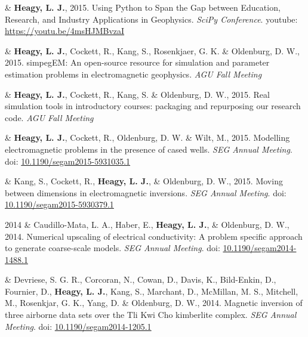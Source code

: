 \documentclass[a4paper, 11pt]{article}
\newcommand{\doi}[1]{doi: \href{https://doi.org/#1}{#1}}
\newcommand{\youtube}[1]{youtube: \href{https://youtu.be/XY3Tq9Wd1\_A}{#1}}
\begin{document}
\begin{entryright}
& \textbf{Heagy, L. J.}, 2015. Using Python to Span the Gap between Education, Research, and Industry Applications in Geophysics. \emph{SciPy Conference}. \youtube{https://youtu.be/4msHJMBvzaI}
\end{entryright}

\begin{entryright}
& \textbf{Heagy, L. J.}, Cockett, R., Kang, S., Rosenkjaer, G. K. \& Oldenburg, D. W., 2015. simpegEM: An open-source resource for simulation and parameter estimation problems in electromagnetic geophysics. \emph{AGU Fall Meeting}
\end{entryright}

\begin{entryright}
& \textbf{Heagy, L. J.}, Cockett, R., Kang, S. \& Oldenburg, D. W., 2015. Real simulation tools in introductory courses: packaging and repurposing our research code. \emph{AGU Fall Meeting}
\end{entryright}

\begin{entryright}
& \textbf{Heagy, L. J.}, Cockett, R., Oldenburg, D. W. \& Wilt, M., 2015. Modelling electromagnetic problems in the presence of cased wells. \emph{SEG Annual Meeting}. \doi{10.1190/segam2015-5931035.1}
\end{entryright}

\begin{entryright}
& Kang, S., Cockett, R., \textbf{Heagy, L. J.}, \& Oldenburg, D. W., 2015. Moving between dimensions in electromagnetic inversions. \emph{SEG Annual Meeting}. \doi{10.1190/segam2015-5930379.1}
\end{entryright}

\begin{entryright}
2014 & Caudillo-Mata, L. A., Haber, E., \textbf{Heagy, L. J.}, \& Oldenburg, D. W., 2014. Numerical upscaling of electrical conductivity: A problem specific approach to generate coarse-scale models. \emph{SEG Annual Meeting}. \doi{10.1190/segam2014-1488.1}
\end{entryright}

\begin{entryright}
& Devriese, S. G. R., Corcoran, N., Cowan, D., Davis, K., Bild-Enkin, D., Fournier, D., \textbf{Heagy, L. J.}, Kang, S., Marchant, D., McMillan, M. S., Mitchell, M., Rosenkjar, G. K., Yang, D. \& Oldenburg, D. W., 2014. Magnetic inversion of three airborne data sets over the Tli Kwi Cho kimberlite complex. \emph{SEG Annual Meeting}. \doi{10.1190/segam2014-1205.1}
\end{entryright}
\end{document}
